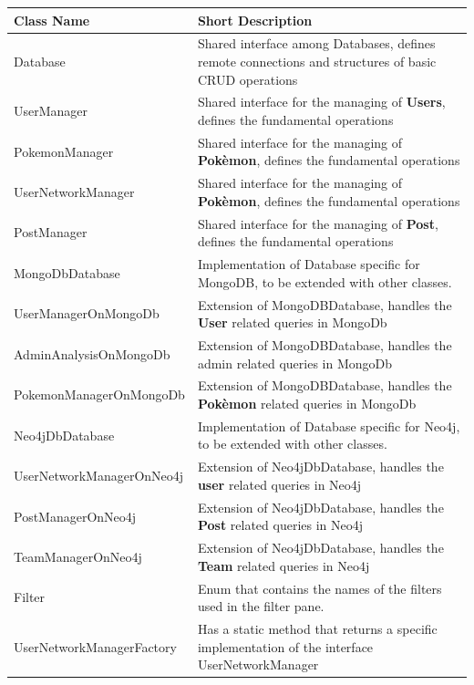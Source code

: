 \begingroup
\setlength{\tabcolsep}{10pt} %
\renewcommand{\arraystretch}{1.5} %
\begin{center}
	\begin{longtable}{| m{14em} | m{19em} |} 
		\hline
		\textbf{Class Name} & \textbf{Short Description} \\ [0.5ex] 
		\hline
		Database & Shared interface among Databases, defines remote connections and structures of basic CRUD operations\\ 
		\hline
		UserManager & Shared interface for the managing of \textbf{Users}, defines the fundamental operations \\ 
		\hline
		PokemonManager & Shared interface for the managing of \textbf{Pokèmon}, defines the fundamental operations \\ 
		\hline
		UserNetworkManager & Shared interface for the managing of \textbf{Pokèmon}, defines the fundamental operations \\ 
		\hline
		PostManager & Shared interface for the managing of \textbf{Post}, defines the fundamental operations\\ 
		\hline
		MongoDbDatabase & Implementation of Database specific for MongoDB, to be extended with other classes.\\ 
		\hline
		UserManagerOnMongoDb & Extension of MongoDBDatabase, handles the \textbf{User} related queries in MongoDb\\ 
		\hline
		AdminAnalysisOnMongoDb & Extension of MongoDBDatabase, handles the admin related queries in MongoDb\\ 
		\hline
		PokemonManagerOnMongoDb & Extension of MongoDBDatabase, handles the \textbf{Pokèmon} related queries in MongoDb\\ 
		\hline
		Neo4jDbDatabase & Implementation of Database specific for Neo4j, to be extended with other classes.\\ 
		\hline
		UserNetworkManagerOnNeo4j & Extension of Neo4jDbDatabase, handles the \textbf{user} related queries in Neo4j\\ 
		\hline
		PostManagerOnNeo4j & Extension of Neo4jDbDatabase, handles the \textbf{Post} related queries in Neo4j\\
		\hline
		TeamManagerOnNeo4j & Extension of Neo4jDbDatabase, handles the \textbf{Team} related queries in Neo4j\\
		\hline
		Filter & Enum that contains the names of the filters used in the filter pane.\\
		\hline
		UserNetworkManagerFactory & Has a static method that returns a specific implementation of the interface UserNetworkManager\\

\end{longtable}
\end{center}
